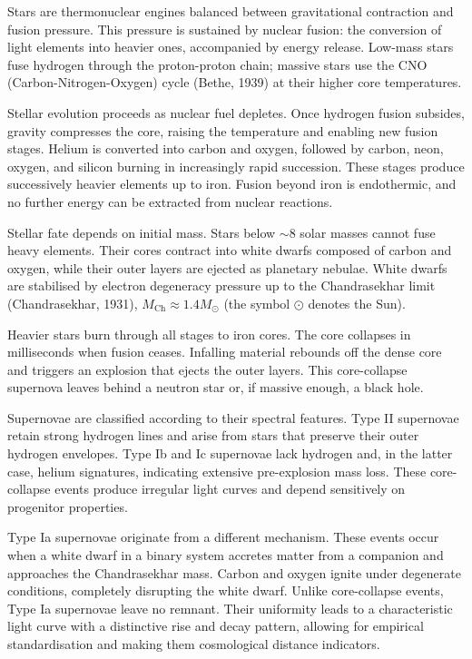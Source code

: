 Stars are thermonuclear engines balanced between gravitational contraction and fusion pressure. This pressure is sustained by nuclear fusion: the conversion of light elements into heavier ones, accompanied by energy release. Low-mass stars fuse hydrogen through the proton-proton chain; massive stars use the CNO (Carbon-Nitrogen-Oxygen) cycle (Bethe, 1939) at their higher core temperatures.

Stellar evolution proceeds as nuclear fuel depletes. Once hydrogen fusion subsides, gravity compresses the core, raising the temperature and enabling new fusion stages. Helium is converted into carbon and oxygen, followed by carbon, neon, oxygen, and silicon burning in increasingly rapid succession. These stages produce successively heavier elements up to iron. Fusion beyond iron is endothermic, and no further energy can be extracted from nuclear reactions.

Stellar fate depends on initial mass. Stars below $\sim 8$ solar masses cannot fuse heavy elements. Their cores contract into white dwarfs composed of carbon and oxygen, while their outer layers are ejected as planetary nebulae. White dwarfs are stabilised by electron degeneracy pressure up to the Chandrasekhar limit (Chandrasekhar, 1931), $M_{\text{Ch}} \approx 1.4 M_\odot$ (the symbol $\odot$ denotes the Sun).

Heavier stars burn through all stages to iron cores. The core collapses in milliseconds when fusion ceases. Infalling material rebounds off the dense core and triggers an explosion that ejects the outer layers. This core-collapse supernova leaves behind a neutron star or, if massive enough, a black hole.

Supernovae are classified according to their spectral features. Type II supernovae retain strong hydrogen lines and arise from stars that preserve their outer hydrogen envelopes. Type Ib and Ic supernovae lack hydrogen and, in the latter case, helium signatures, indicating extensive pre-explosion mass loss. These core-collapse events produce irregular light curves and depend sensitively on progenitor properties.

Type Ia supernovae originate from a different mechanism. These events occur when a white dwarf in a binary system accretes matter from a companion and approaches the Chandrasekhar mass. Carbon and oxygen ignite under degenerate conditions, completely disrupting the white dwarf. Unlike core-collapse events, Type Ia supernovae leave no remnant. Their uniformity leads to a characteristic light curve with a distinctive rise and decay pattern, allowing for empirical standardisation and making them cosmological distance indicators.

